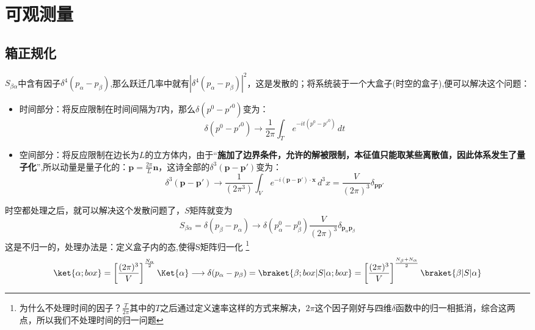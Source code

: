 \section{可观测量}
\subsection{箱正规化}
$S_{\beta\alpha}$中含有因子$\delta^4(p_\alpha-p_\beta)$,那么跃迁几率中就有$|\delta^4(p_\alpha-p_\beta)|^2$，这是发散的；将系统装于一个大盒子(时空的盒子),便可以解决这个问题：
\begin{itemize}
    \item 时间部分：将反应限制在时间间隔为$T$内，那么$\delta(p^0-p'^0)$变为：
    \[\delta(p^0-p'^0)\to\frac{1}{2\pi}\int_T\,e^{-it(p^0-p'^0)}\,dt
    \]
    \item 空间部分：将反应限制在边长为$L$的立方体内，由于“\textbf{施加了边界条件，允许的解被限制，本征值只能取某些离散值，因此体系发生了量子化}”,所以动量是量子化的：$\boldsymbol{p}=\frac{2\pi}{L}\boldsymbol{n}$，这诗全部的$\delta^3(\boldsymbol{p}-\boldsymbol{p'})$变为：
    \[\delta^3(\boldsymbol{p}-\boldsymbol{p'})\to \frac{1}{(2\pi^3)}\int_V\,e^{-i(\boldsymbol{p}-\boldsymbol{p'})\cdot\boldsymbol{x}}\,d^3x=\frac{V}{(2\pi)^3}\delta_{\boldsymbol{p}\boldsymbol{p}'}
    \]
\end{itemize}
时空都处理之后，就可以解决这个发散问题了，$S$矩阵就变为
$$S_{\beta\alpha}=\delta(p_\beta-p_\alpha)\to
\delta(p_\alpha^0-p_\beta^0)\frac{V}{(2\pi)^3}\delta_{\boldsymbol{p}_\alpha\boldsymbol{p}_\beta}$$
这是不归一的，处理办法是：定义盒子内的态,使得S矩阵归一化
\footnote{为什么不处理时间的因子？$\frac{T}{2\pi}$其中的$T$之后通过定义速率这样的方式来解决，$2\pi$这个因子刚好与四维$\delta$函数中的归一相抵消，综合这两点，所以我们不处理时间的归一问题}
$$
    \ket{\alpha;box}=\left[\frac{(2\pi)^3}{V}\right]^{\frac{N_\alpha}{2}}\Ket{\alpha}
    \longrightarrow\delta(p_\alpha-p_\beta)
    =\braket{\beta;box|S|\alpha;box}
    =\left[\frac{(2\pi)^3}{V}\right]^{\frac{N_\beta+N_\alpha}{2}}\braket{\beta|S|\alpha}
$$
